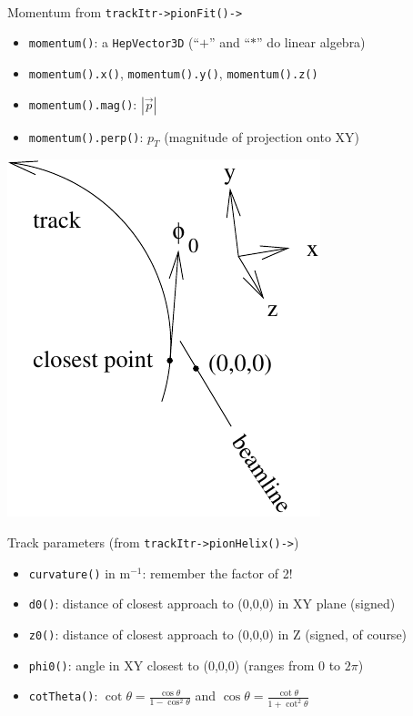 \documentclass[landscape]{article}
\newenvironment{slide}{\mbox{ }\vfill}{\vfill \mbox{ } \pagebreak}
\begin{document}


\begin{slide}
\huge

Momentum from {\tt trackItr->pionFit()->}
\begin{itemize}
  \item {\tt momentum()}: a {\tt HepVector3D} (``$+$'' and ``$*$'' do linear algebra)
  \item {\tt momentum().x()}, {\tt momentum().y()}, {\tt momentum().z()}
  \item {\tt momentum().mag()}: $|\vec{p}|$
  \item {\tt momentum().perp()}: $p_T$ (magnitude of projection onto XY)
\end{itemize}

\vspace{-2 cm}
\begin{flushright}
  \includegraphics[width=6 cm]{track_parameters}
\end{flushright}

\vspace{-5 cm}
Track parameters (from {\tt trackItr->pionHelix()->})
\begin{itemize}
  \item {\tt curvature()} in m$^{-1}$: remember the factor of 2!
  \item {\tt d0()}: distance of closest approach to (0,0,0) in XY plane (signed)
  \item {\tt z0()}: distance of closest approach to (0,0,0) in Z (signed, of course)
  \item {\tt phi0()}: angle in XY closest to (0,0,0) (ranges from 0 to $2\pi$)
  \item {\tt cotTheta()}: $\displaystyle \cot\theta = \frac{\cos\theta}{1 -
  \cos^2\theta}$ and $\displaystyle \cos\theta = \frac{\cot\theta}{1 +
  \cot^2\theta}$
\end{itemize}


\end{slide}
\end{document}
